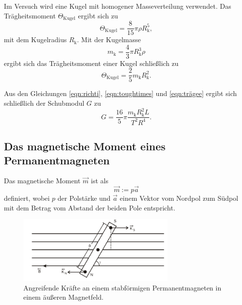 Im Versuch wird eine Kugel mit homogener Masseverteilung verwendet.
Das Trägheitsmoment $\Theta_{\mathrm{Kugel}}$ ergibt sich zu
\begin{equation*}
	\Theta_{\mathrm{Kugel}} = \frac{8}{15} \pi \rho R_{\mathrm{k}}^5 \mathrm{,}
\end{equation*}
mit dem Kugelradius $R_{\mathrm{k}}$.
Mit der Kugelmasse
\begin{equation*}
	m_{\mathrm{k}} = \frac{4}{3} \pi R_{\mathrm{k}}^3 \rho
\end{equation*}
ergibt sich das Trägheitsmoment einer Kugel schließlich zu
\begin{equation}
	\label{eqn:trägee}
	\Theta_{\mathrm{Kugel}}=\frac{2}{5} m_{\mathrm{k}} R_{\mathrm{k}}^2 \mathrm{.}
\end{equation}

Aus den Gleichungen \eqref{eqn:richti}, \eqref{eqn:toughtimes} und \eqref{eqn:trägee} ergibt
sich schließlich der Schubmodul $G$ zu
\begin{equation}
	\label{eqn:schubischu}
	G = \frac{16}{5} \pi \frac{m_{\mathrm{k}} R_{\mathrm{k}}^2 L}{T^2 R^4} \mathrm{.}
\end{equation}


\FloatBarrier
\subsection{Das magnetische Moment eines Permanentmagneten}
\FloatBarrier
Das magnetische Moment $\vec{m}$ ist als
\begin{equation}
	\vec{m} := p \vec{a}
\end{equation}
definiert, wobei $p$ der Polstärke und $\vec{a}$ einem Vektor vom Nordpol zum Südpol mit dem
Betrag vom Abstand der beiden Pole entspricht.
\begin{figure}
	\centering
	\includegraphics[width=0.7\textwidth]{Bilder/Magnet.png}
	\caption{Angreifende Kräfte an einem stabförmigen Permanentmagneten in einem äußeren Magnetfeld. \cite{Anleitung}}
	\label{fig:magnetus}
\end{figure}

